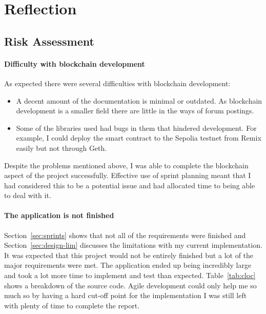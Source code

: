 \section{Reflection}

\subsection*{Risk Assessment}

\paragraph*{Difficulty with blockchain development}
As expected there were several difficulties with blockchain development:

\begin{itemize}
  \item A decent amount of the documentation is minimal or outdated. As blockchain development is a smaller field there are little in the ways of forum postings.
  \item Some of the libraries used had bugs in them that hindered development. For example, I could deploy the smart contract to the Sepolia testnet from Remix easily but not through Geth. 
\end{itemize}

\vspace{2mm}\noindent
Despite the problems mentioned above, I was able to complete the blockchain aspect of the project successfully. Effective use of sprint planning meant that I had considered this to be a potential issue and had allocated time to being able to deal with it.

\paragraph*{The application is not finished}
Section~\ref{sec:sprints} shows that not all of the requirements were finished and Section~\ref{sec:design-lim} discusses the limitations with my current implementation. It was expected that this project would not be entirely finished but a lot of the major requirements were met.
\x
The application ended up being incredibly large and took a lot more time to implement and test than expected. Table~\ref{tab:cloc} shows a breakdown of the source code. Agile development could only help me so much so by having a hard cut-off point for the implementation I was still left with plenty of time to complete the report.

